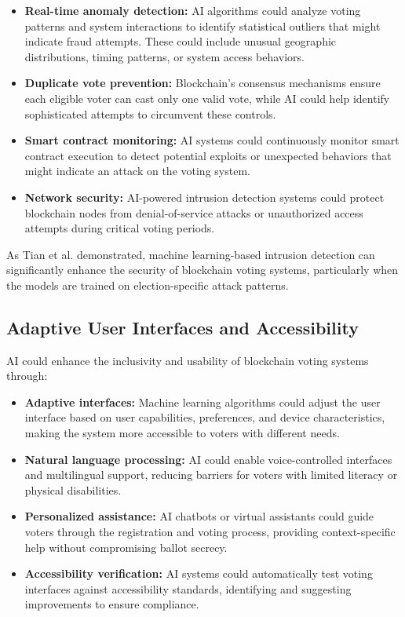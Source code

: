 \documentclass[conference]{IEEEtran}
\begin{document}
\begin{itemize}
    \item \textbf{Real-time anomaly detection:} AI algorithms could analyze voting patterns and system interactions to identify statistical outliers that might indicate fraud attempts. These could include unusual geographic distributions, timing patterns, or system access behaviors.
    
    \item \textbf{Duplicate vote prevention:} Blockchain's consensus mechanisms ensure each eligible voter can cast only one valid vote, while AI could help identify sophisticated attempts to circumvent these controls.
    
    \item \textbf{Smart contract monitoring:} AI systems could continuously monitor smart contract execution to detect potential exploits or unexpected behaviors that might indicate an attack on the voting system.
    
    \item \textbf{Network security:} AI-powered intrusion detection systems could protect blockchain nodes from denial-of-service attacks or unauthorized access attempts during critical voting periods.
\end{itemize}

As Tian et al. \cite{b14} demonstrated, machine learning-based intrusion detection can significantly enhance the security of blockchain voting systems, particularly when the models are trained on election-specific attack patterns.

\subsection{Adaptive User Interfaces and Accessibility}
AI could enhance the inclusivity and usability of blockchain voting systems through:

\begin{itemize}
    \item \textbf{Adaptive interfaces:} Machine learning algorithms could adjust the user interface based on user capabilities, preferences, and device characteristics, making the system more accessible to voters with different needs.
    
    \item \textbf{Natural language processing:} AI could enable voice-controlled interfaces and multilingual support, reducing barriers for voters with limited literacy or physical disabilities.
    
    \item \textbf{Personalized assistance:} AI chatbots or virtual assistants could guide voters through the registration and voting process, providing context-specific help without compromising ballot secrecy.
    
    \item \textbf{Accessibility verification:} AI systems could automatically test voting interfaces against accessibility standards, identifying and suggesting improvements to ensure compliance.
\end{itemize}
\end{document}
